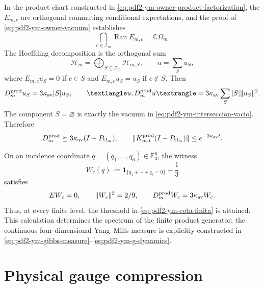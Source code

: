 In the product chart constructed in
\eqref{eq:pdf2-ym-owner-product-factorization}, the $E_{m,c}$ are orthogonal commuting
conditional expectations, and the proof of
\eqref{eq:pdf2-ym-owner-vacuum} establishes
\begin{equation}\label{eq:pdf2-ym-interseccion-vacio}
 \bigcap_{c\in\mathcal I_m}\operatorname{Ran}E_{m,c}
 =\mathbb C\Omega_m.
\end{equation}
The Hoeffding decomposition is the orthogonal sum
\[
 \mathcal H_m=\bigoplus_{S\subseteq\mathcal I_m}\mathcal H_{m,S},
 \qquad u=\sum_Su_S,
\]
where $E_{m,c}u_S=0$ if $c\in S$ and $E_{m,c}u_S=u_S$ if $c\notin S$.
Then
\begin{equation}\label{eq:pdf2-ym-hoeffding}
 D_m^{\rm prod}u_S=3\kappa_{\rm av}|S|u_S,
 \qquad
 \langle u,D_m^{\rm prod}u\rangle
 =3\kappa_{\rm av}\sum_S|S|\|u_S\|^2.
\end{equation}
The component $S=\varnothing$ is exactly the vacuum in
\eqref{eq:pdf2-ym-interseccion-vacio}. Therefore
\begin{equation}\label{eq:pdf2-ym-cota-finita}
 D_m^{\rm prod}\succeq
 3\kappa_{\rm av}(I-P_{\Omega_m}),
 \qquad
 \|K^{\rm prod}_{m,t}(I-P_{\Omega_m})\|
 \le e^{-3\kappa_{\rm av}t}.
\end{equation}

On an incidence coordinate
$q=(q_1,\ldots,q_6)\in\mathbb F_3^6$, the witness
\begin{equation}\label{eq:pdf2-ym-wc}
 W_c(q):=\mathbf1_{\{q_1+\cdots+q_6=0\}}-\frac13
\end{equation}
satisfies
\begin{equation}\label{eq:pdf2-ym-wc-momentos}
 \mathbb EW_c=0,\qquad \|W_c\|^2=\frac29,\qquad
 D_m^{\rm prod}W_c=3\kappa_{\rm av}W_c.
\end{equation}
Thus, at every finite level, the threshold in
\eqref{eq:pdf2-ym-cota-finita} is attained. This calculation determines the spectrum of the
finite product generator; the continuous four-dimensional Yang--Mills measure is
explicitly constructed in
\eqref{eq:pdf2-ym-gibbs-measure}--\eqref{eq:pdf2-ym-g-dynamics}.

\section{Physical gauge compression}

